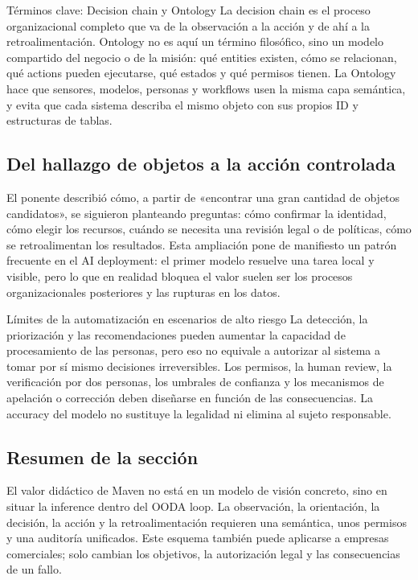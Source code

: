 \begin{importantbox}{Términos clave: Decision chain y Ontology}
La decision chain es el proceso organizacional completo que va de la observación a la acción y de ahí a la retroalimentación. Ontology no es aquí un término filosófico, sino un modelo compartido del negocio o de la misión: qué entities existen, cómo se relacionan, qué actions pueden ejecutarse, qué estados y qué permisos tienen. La Ontology hace que sensores, modelos, personas y workflows usen la misma capa semántica, y evita que cada sistema describa el mismo objeto con sus propios ID y estructuras de tablas.
\end{importantbox}

\subsection{Del hallazgo de objetos a la acción controlada}

El ponente describió cómo, a partir de «encontrar una gran cantidad de objetos candidatos», se siguieron planteando preguntas: cómo confirmar la identidad, cómo elegir los recursos, cuándo se necesita una revisión legal o de políticas, cómo se retroalimentan los resultados. Esta ampliación pone de manifiesto un patrón frecuente en el AI deployment: el primer modelo resuelve una tarea local y visible, pero lo que en realidad bloquea el valor suelen ser los procesos organizacionales posteriores y las rupturas en los datos.

\begin{warningbox}{Límites de la automatización en escenarios de alto riesgo}
La detección, la priorización y las recomendaciones pueden aumentar la capacidad de procesamiento de las personas, pero eso no equivale a autorizar al sistema a tomar por sí mismo decisiones irreversibles. Los permisos, la human review, la verificación por dos personas, los umbrales de confianza y los mecanismos de apelación o corrección deben diseñarse en función de las consecuencias. La accuracy del modelo no sustituye la legalidad ni elimina al sujeto responsable.
\end{warningbox}

\subsection{Resumen de la sección}

El valor didáctico de Maven no está en un modelo de visión concreto, sino en situar la inference dentro del OODA loop. La observación, la orientación, la decisión, la acción y la retroalimentación requieren una semántica, unos permisos y una auditoría unificados. Este esquema también puede aplicarse a empresas comerciales; solo cambian los objetivos, la autorización legal y las consecuencias de un fallo.
